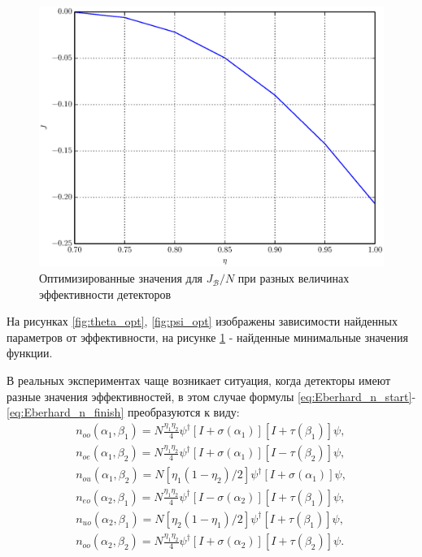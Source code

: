 \documentclass[%
master,         %
subf,           %
href,           %
colorlinks=true %
]{disser}
\numberwithin{equation}{section}
\numberwithin{figure}{section}
\begin{document}
\begin{figure}[h]
\includegraphics[scale=0.7]{J.eps}
\caption{Оптимизированные значения для $J_{\mathcal{B}}/N$ при разных величинах эффективности детекторов}
\label{fig:J_opt}
\end{figure}

На рисунках \ref{fig:theta_opt}, \ref{fig:psi_opt} изображены зависимости найденных параметров от эффективности, на рисунке \ref{fig:J_opt} - найденные минимальные значения функции.

В реальных экспериментах чаще возникает ситуация, когда детекторы имеют разные значения эффективностей, в этом случае формулы \eqref{eq:Eberhard_n_start}-\eqref{eq:Eberhard_n_finish} преобразуются к виду:
\begin{eqnarray*}
n_{oo}(\alpha_1, \beta_1) = N\frac{\eta_1\eta_2}{4}\psi^\dagger[I + \sigma(\alpha_1)][I + \tau(\beta_1)]\psi,\\
n_{oe}(\alpha_1, \beta_2) = N\frac{\eta_1\eta_2}{4}\psi^\dagger[I + \sigma(\alpha_1)][I - \tau(\beta_2)]\psi,\\
n_{ou}(\alpha_1, \beta_2) = N[\eta_1(1 - \eta_2)/2]\psi^\dagger[I + \sigma(\alpha_1)]\psi,\\
n_{eo}(\alpha_2, \beta_1) = N\frac{\eta_1\eta_2}{4}\psi^\dagger[I - \sigma(\alpha_2)][I + \tau(\beta_1)]\psi,\\
n_{uo}(\alpha_2, \beta_1) = N[\eta_2(1 - \eta_1)/2]\psi^\dagger[I + \tau(\beta_1)]\psi,\\
n_{oo}(\alpha_2, \beta_2) = N\frac{\eta_1\eta_2}{4}\psi^\dagger[I + \sigma(\alpha_2)][I + \tau(\beta_2)]\psi.
\end{eqnarray*}
\end{document}
